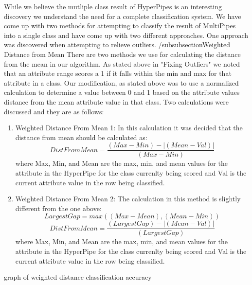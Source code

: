 While we believe the mutliple class result of HyperPipes is 
an interesting discovery we understand the need for a complete 
classification system. We have come up with two methods for
attempting to classify the result of MultiPipes into a single 
class and have come up with two different approaches. One 
approach was discovered when attempting to relieve outliers.
/subsubsection{Weighted Distance from Mean}
There are two methods we use for calculating the distance from 
the mean in our algorithm. As stated above in "Fixing Outliers" 
we noted that an attribute range scores a 1 if it falls within 
the min and max for that attribute in a class. Our modification, 
as stated above was to use a normalized calculation to determine 
a value between 0 and 1 based on the attribute values distance 
from the mean attribute value in that class. Two calculations 
were discussed and they are as follows:
\begin{enumerate}
\item Weighted Distance From Mean 1: In this calculation it was 
decided that the distance from mean should be calculated as:
\begin{equation}
  DistFromMean=\frac{(Max-Min)-|(Mean-Val)|}{(Max-Min)}
\end{equation}
where Max, Min, and Mean are the max, min, and mean values for 
the attribute in the HyperPipe for the class currenlty being 
scored and Val is the current attribute value in the row being 
classified. 
\item Weighted Distance From Mean 2: The calculation in this 
method is slightly different from the one above:
\begin{equation}
  LargestGap = max((Max-Mean),(Mean-Min))
\end{equation}
\begin{equation}
  DistFromMean=\frac{(LargestGap)-|(Mean-Val)|}{(LargestGap)}
\end{equation}
where Max, Min, and Mean are the max, min, and mean values for 
the attribute in the HyperPipe for the class currenlty being 
scored and Val is the current attribute value in the row being 
classified.
\end{enumerate}



graph of weighted distance classification accuracy

